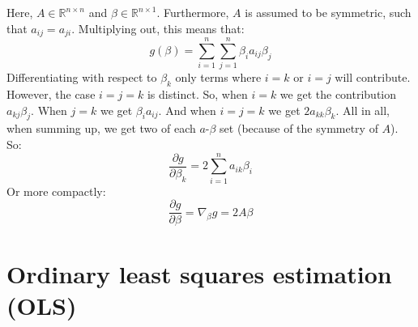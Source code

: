 \documentclass[12pt, a4paper]{article}
\begin{document}
Here, $A\in\mathbb{R}^{n\times n}$ and $\beta\in\mathbb{R}^{n\times 1}$. Furthermore, $A$ is assumed to be symmetric, such that $a_{ij}=a_{ji}$. Multiplying out, this means that:
\begin{equation}
g(\beta)=\sum_{i=1}^n\sum_{j=1}^n\beta_i a_{ij}\beta_j
\end{equation}
Differentiating with respect to $\beta_k$ only terms where $i=k$ or $i=j$ will contribute. However, the case $i=j=k$ is distinct. So, when $i=k$ we get the contribution $a_{kj}\beta_j$. When $j=k$ we get $\beta_i a_{ij}$. And when $i=j=k$ we get $2a_{kk}\beta_k$. All in all, when summing up, we get two of each $a$-$\beta$ set (because of the symmetry of $A$). So:
\begin{equation}
\frac{\partial g}{\partial\beta_k}=2\sum_{i=1}^n a_{ik}\beta_i
\end{equation}
Or more compactly:
\begin{equation}
\label{quadformdif}
\frac{\partial g}{\partial \beta}=\nabla_\beta g=2A\beta
\end{equation}

\section{Ordinary least squares estimation (OLS)}
\end{document}
